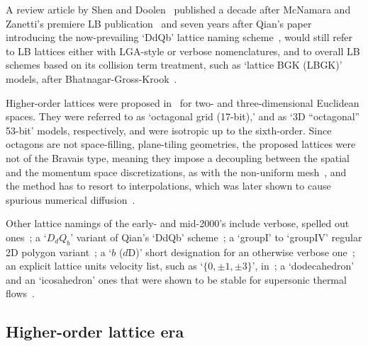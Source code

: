     A review article by Shen and  Doolen~\cite{1998-ChenS+DoolenGD-AnnuRevFluidMech}  published  a  decade  after  McNamara  and
    Zanetti's premiere LB publication~\cite{1988-McNamaraGR+ZanettiG-PhysRevLett} and seven years after Qian's paper introducing
    the now-prevailing `DdQb' lattice naming scheme~\cite{1991-QianYH+LallemandP-AdvKinTheoContMech}, would still  refer  to  LB
    lattices either with LGA-style or verbose nomenclatures, and to overall LB schemes based on its  collision  term  treatment,
    such    as    `lattice    BGK    (LBGK)'    models,    after    Bhatnagar-Gross-Krook~\cite{1954-BhatnagarPL+KrookM-PhysRev,
    2003-LiboffRL-bookSpringer, 2011-HarrisS-Dover}.

    Higher-order lattices were proposed  in~\cite{1998-PavloP+VahalaL-PhysRevLett}  for  two-  and  three-dimensional  Euclidean
    spaces. They were referred to as `octagonal grid (17-bit),' and as `3D ``octagonal'' 53-bit' models, respectively, and  were
    isotropic up to the sixth-order. Since octagons are not space-filling, plane-tiling geometries, the proposed  lattices  were
    not of the Bravais type, meaning they impose a decoupling between the spatial and the  momentum  space  discretizations,  as
    with the non-uniform mesh~\cite{1996-HeX+DemboM-JComputPhys}, and the method has to  resort  to  interpolations,  which  was
    later shown to cause spurious numerical diffusion~\cite[p.~429]{2006-ShanX+ChenH-JFluidMech}.

    Other     lattice     namings     of     the     early-     and     mid-2000's     include     verbose,     spelled      out
    ones~\cite{2001-dHumieresD+LallemandP-PhysRevE,   2005-LuXY-IntJModPhysC};   a   `$D_dQ_b$'   variant   of   Qian's   `DdQb'
    scheme~\cite{2003-NourgalievRR+JosephD-IntJMulFlow};     a     `groupI'     to     `groupIV'     regular     2D      polygon
    variant~\cite{2003-WatariM+TsutaharaM-PhysRevE, 2007-WatariM-PhysA}; a `$b$  ($d$D)'  short  designation  for  an  otherwise
    verbose one~\cite{2006-ChikatamarlaSS+KarlinIV-PhysRevLett}; an explicit lattice units velocity list, such as `$\{0, \pm  1,
    \pm 3\}$', in~\cite{2006-ChikatamarlaSS+KarlinIV-PhysRevLett}; a `dodecahedron' and an `icosahedron' ones that were shown to
    be stable for supersonic thermal flows~\cite{2006-WatariM+TsutaharaM-PhysA, 2007-WatariM-PhysA}.

    \subsection{Higher-order lattice era}

